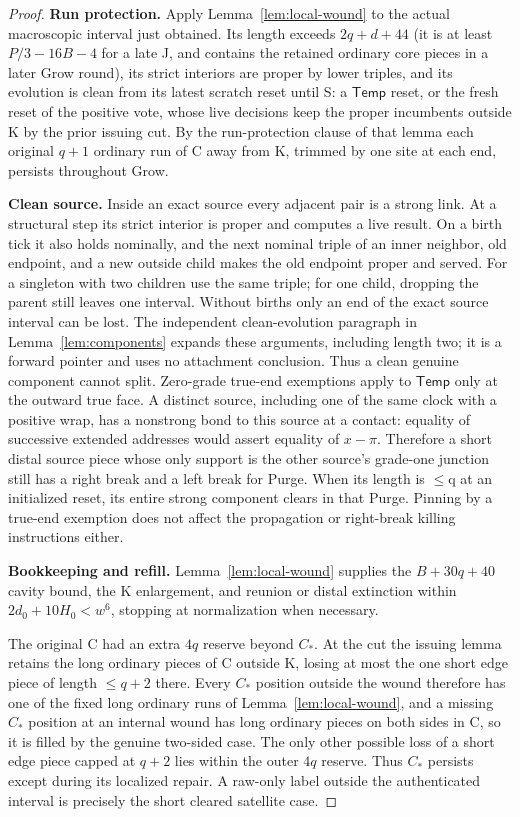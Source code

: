 \begin{proof}
\textbf{Run protection.} Apply Lemma~\ref{lem:local-wound} to the actual macroscopic interval just obtained. Its length exceeds \(2q+d+44\) (it is at least \(P/3-16B-4\) for a late J, and contains the retained ordinary core pieces in a later Grow round), its strict interiors are proper by lower triples, and its evolution is clean from its latest scratch reset until S: a \(\mathsf{Temp}\) reset, or the fresh reset of the positive vote, whose live decisions keep the proper incumbents outside K by the prior issuing cut. By the run-protection clause of that lemma each original \(q+1\) ordinary run of C away from K, trimmed by one site at each end, persists throughout Grow.

\textbf{Clean source.} Inside an exact source every adjacent pair is a strong link. At a structural step its strict interior is proper and computes a live result. On a birth tick it also holds nominally, and the next nominal triple of an inner neighbor, old endpoint, and a new outside child makes the old endpoint proper and served. For a singleton with two children use the same triple; for one child, dropping the parent still leaves one interval. Without births only an end of the exact source interval can be lost. The independent clean-evolution paragraph in Lemma~\ref{lem:components} expands these arguments, including length two; it is a forward pointer and uses no attachment conclusion. Thus a clean genuine component cannot split. Zero-grade true-end exemptions apply to \(\mathsf{Temp}\) only at the outward true face. A distinct source, including one of the same clock with a positive wrap, has a nonstrong bond to this source at a contact: equality of successive extended addresses would assert equality of \(x-\pi\). Therefore a short distal source piece whose only support is the other source's grade-one junction still has a right break and a left break for Purge. When its length is \(\le\)q at an initialized reset, its entire strong component clears in that Purge. Pinning by a true-end exemption does not affect the propagation or right-break killing instructions either.

\textbf{Bookkeeping and refill.} Lemma~\ref{lem:local-wound} supplies the \(B+30q+40\) cavity bound, the K enlargement, and reunion or distal extinction within \(2d_0+10H_0<w^6\), stopping at normalization when necessary.

The original C had an extra \(4q\) reserve beyond \(C_*\). At the cut the issuing lemma retains the long ordinary pieces of C outside K, losing at most the one short edge piece of length \(\le\)\(q+2\) there. Every \(C_*\) position outside the wound therefore has one of the fixed long ordinary runs of Lemma~\ref{lem:local-wound}, and a missing \(C_*\) position at an internal wound has long ordinary pieces on both sides in C, so it is filled by the genuine two-sided case. The only other possible loss of a short edge piece capped at \(q+2\) lies within the outer \(4q\) reserve. Thus \(C_*\) persists except during its localized repair. A raw-only label outside the authenticated interval is precisely the short cleared satellite case.


\end{proof}
